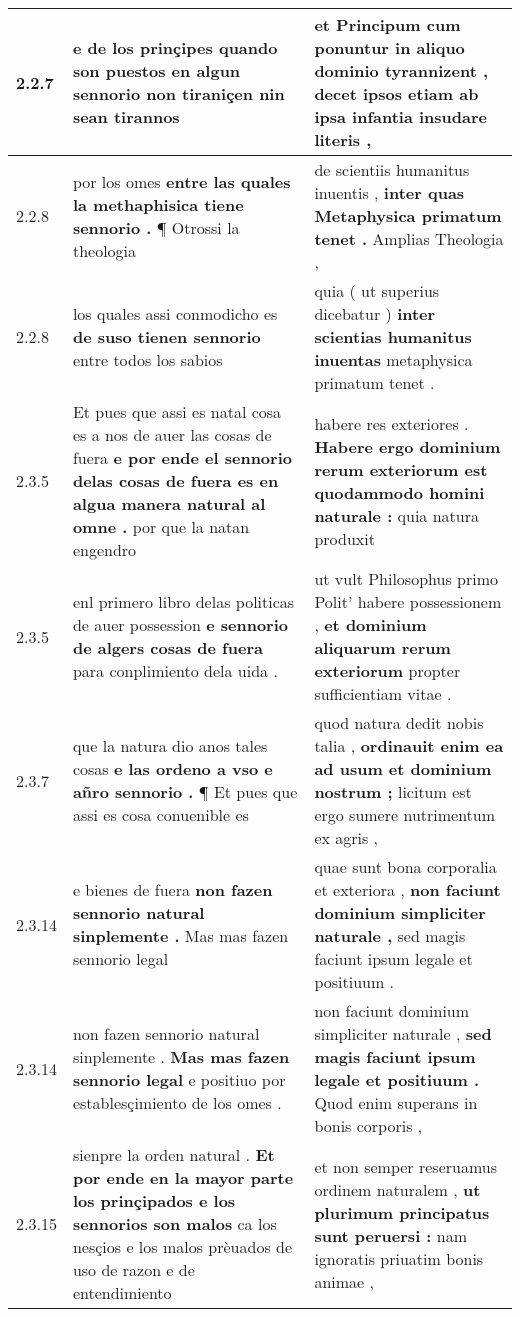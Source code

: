 \begin{tabular}{|p{1cm}|p{6.5cm}|p{6.5cm}|}
2.2.7 & e de los prinçipes \textbf{ quando son puestos en algun sennorio non tiraniçen } nin sean tirannos & et Principum \textbf{ cum ponuntur in aliquo dominio tyrannizent , } decet ipsos etiam ab ipsa infantia insudare literis , \\\hline
2.2.8 & por los omes \textbf{ entre las quales la methaphisica tiene sennorio . } ¶ Otrossi la theologia & de scientiis humanitus inuentis , \textbf{ inter quas Metaphysica primatum tenet . } Amplias Theologia , \\\hline
2.2.8 & los quales assi conmodicho es \textbf{ de suso tienen sennorio } entre todos los sabios & quia ( ut superius dicebatur ) \textbf{ inter scientias humanitus inuentas } metaphysica primatum tenet . \\\hline
2.3.5 & Et pues que assi es natal cosa es a nos de auer las cosas de fuera \textbf{ e por ende el sennorio delas cosas de fuera es en algua manera natural al omne . } por que la natan engendro & habere res exteriores . \textbf{ Habere ergo dominium rerum exteriorum est quodammodo homini naturale : } quia natura produxit \\\hline
2.3.5 & enl primero libro delas politicas de auer possession \textbf{ e sennorio de algers cosas de fuera } para conplimiento dela uida . & ut vult Philosophus primo Polit’ habere possessionem , \textbf{ et dominium aliquarum rerum exteriorum } propter sufficientiam vitae . \\\hline
2.3.7 & que la natura dio anos tales cosas \textbf{ e las ordeno a vso e añro sennorio . } ¶ Et pues que assi es cosa conuenible es & quod natura dedit nobis talia , \textbf{ ordinauit enim ea ad usum et dominium nostrum ; } licitum est ergo sumere nutrimentum ex agris , \\\hline
2.3.14 & e bienes de fuera \textbf{ non fazen sennorio natural sinplemente . } Mas mas fazen sennorio legal & quae sunt bona corporalia et exteriora , \textbf{ non faciunt dominium simpliciter naturale , } sed magis faciunt ipsum legale et positiuum . \\\hline
2.3.14 & non fazen sennorio natural sinplemente . \textbf{ Mas mas fazen sennorio legal } e positiuo por establesçimiento de los omes . & non faciunt dominium simpliciter naturale , \textbf{ sed magis faciunt ipsum legale et positiuum . } Quod enim superans in bonis corporis , \\\hline
2.3.15 & sienpre la orden natural . \textbf{ Et por ende en la mayor parte los prinçipados e los sennorios son malos } ca los nesçios e los malos prèuados de uso de razon e de entendimiento & et non semper reseruamus ordinem naturalem , \textbf{ ut plurimum principatus sunt peruersi : } nam ignoratis priuatim bonis animae , \\\hline

\end{tabular}
